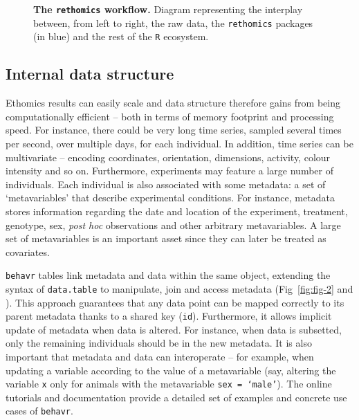 \documentclass[10pt,letterpaper]{article}\usepackage[]{graphicx}\usepackage[]{color}
\begin{document}
\begin{figure}[!h]
	\caption{{\bf The \texttt{rethomics} workflow.}
		Diagram representing the interplay between, from left to right, the raw data, the \texttt{rethomics} packages (in blue) and the rest of the \texttt{R} ecosystem.}
	\label{fig:fig-1}
\end{figure}


\subsection*{Internal data structure}

Ethomics results can easily scale and data structure therefore gains from being computationally efficient -- both in terms of memory footprint and processing speed.
For instance, there could be very long time series, sampled several times per second, over multiple days, for each individual. %
In addition, time series can be multivariate -- encoding coordinates, orientation, dimensions, activity, colour intensity and so on.
Furthermore, experiments may  feature a large number of individuals. %
Each individual is also associated with some metadata: a set of `metavariables' that describe experimental conditions.
For instance, metadata stores information regarding the date and location of the experiment, treatment, genotype, sex, \emph{post hoc} observations and other arbitrary metavariables.
A large set of metavariables is an important asset since they can later be treated as covariates. 

\texttt{behavr} tables link metadata and data within the same object, extending the syntax of \texttt{data.table} to manipulate, join and access metadata (Fig~\ref{fig:fig-2} and ).
This approach guarantees that any data point can be mapped correctly to its parent metadata thanks to a shared key (\texttt{id}).
Furthermore, it allows implicit update of metadata when data is altered.
For instance, when data is subsetted, only the remaining individuals should be in the new metadata. 
It is also important that metadata and data can interoperate --
for example, when updating a variable according to the value of a metavariable (say, altering the variable \texttt{x} only for animals with the metavariable \texttt{sex = `male'}).
The online tutorials and documentation provide a detailed set of examples and concrete use cases of \texttt{behavr}. 
\end{document}
